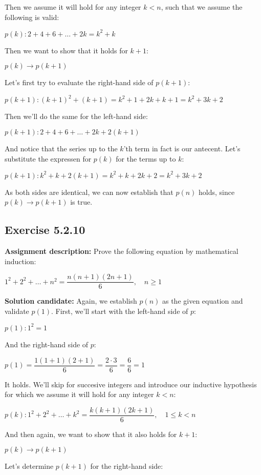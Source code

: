 \documentclass{report}
\newcommand{\cent}[1]{\begin{center}#1\end{center}}
\newcommand{\AssignmentDescription}{\textbf{Assignment description: }}
\newcommand{\Solution}{\textbf{Solution candidate: }}
\newcommand{\QED}{\boxed{}}
\newcommand{\Exercise}[1]{\subsection{Exercise #1}}
\begin{document}
	Then we assume it will hold for any integer $k < n$, such that we assume the following is valid:
	
	\cent{$p(k) : 2 + 4 +6 + \dots + 2k = k^2+k$}
	
	Then we want to show that it holds for $k+1$:
	
	\cent{$p(k) \to p(k+1)$}
	
	Let's first try to evaluate the right-hand side of $p(k+1)$:
	
	\cent{$p(k+1) : (k+1)^2 + (k+1) = k^2+1+2k + k+1 = k^2 +3k +2$}
	
	Then we'll do the same for the left-hand side:
	
	\cent{$p(k+1) : 2+ 4 + 6 + \dots + 2k + 2(k+1) $}
	
	And notice that the series up to the $k$'th term in fact is our antecent.  Let's substitute the expressen for $p(k)$ for the terms up to $k$:
	
	\cent{$p(k+1) : k^2+k + 2(k+1) = k^2+k+2k+2 = k^2+3k +2 $}
	
	As both sides are identical, we can now establish that $p(n)$ holds, since $p(k) \to p(k+1)$ is true.\\
	
	\QED
 		
 	\Exercise{5.2.10}
 	
 	\AssignmentDescription
 	Prove the following equation by mathematical induction:
 	
 	\cent{$1^2 + 2^2 + \dots + n^2 = \dfrac{n(n+1)(2n+1)}{6}, \quad n \geq 1$}
 	
 	\Solution
 	Again, we establish $p(n)$ as the given equation and validate $p(1)$. First, we'll start with the left-hand side of $p$:
 	
 	\cent{$p(1) : 1^2 = 1$}
 	
 	And the right-hand side of $p$:
 	
 	\cent{$p(1) = \dfrac{1(1+1)(2+1)}{6} = \dfrac{2 \cdot 3}{6} = \dfrac{6}{6} = 1 $}
 	
 	It holds. We'll skip for succesive integers and introduce our inductive hypothesis for which we assume it will hold for any integer $k<n$:
 	
 	\cent{$p(k) :  1^2 + 2^2 + \dots + k^2 = \dfrac{k(k+1)(2k+1)}{6}, \quad 1 \leq k < n $}
 	
 	And then again, we want to show that it also holds for $k+1$:
 	
 	\cent{$p(k) \to p(k+1)$}
 	
 	Let's determine $p(k+1)$ for the right-hand side:
 	
\end{document}
